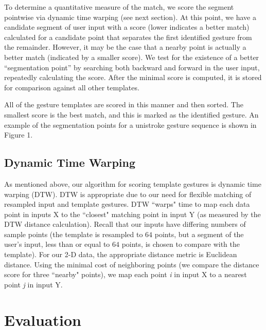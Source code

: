 \documentclass[twoside]{article}
\begin{document}
\begin{multicols}{2}
To determine a quantitative measure of the match, we score the segment pointwise
via dynamic time warping (see next section). At this point, we have a candidate
segment of user input with a score (lower indicates a better match) calculated
for a candidate point that separates the first identified gesture from the
remainder. However, it may be the case that a nearby point is actually a better
match (indicated by a smaller score). We test for the existence of a better
``segmentation point'' by searching both backward and forward in the user input,
repeatedly calculating the score. After the minimal score is computed, it is
stored for comparison against all other templates.

All of the gesture templates are scored in this manner and then sorted. The
smallest score is the best match, and this is marked as the identified gesture. An example
of the segmentation points for a unistroke gesture sequence is shown in Figure 1.

\subsection*{Dynamic Time Warping}

As mentioned above, our algorithm for scoring template gestures is dynamic time
warping (DTW). DTW is appropriate due to our need for flexible matching of
resampled input and template gestures. DTW ``warps" time to map each data point in
inputs X to the ``closest" matching point in input Y (as measured by the DTW distance
calculation). Recall that our inputs have differing numbers of sample points
(the template is resampled to $64$ points, but a segment of the user's input,
less than or equal to $64$ points, is chosen to compare with the template). For
our 2-D data, the appropriate distance metric is Euclidean distance. Using the
minimal cost of neighboring points (we compare the distance score for three ``nearby" points),
we map each point \emph{i} in input X to a nearest point \emph{j} in input Y.

\section{Evaluation}



\end{multicols}
\end{document}
